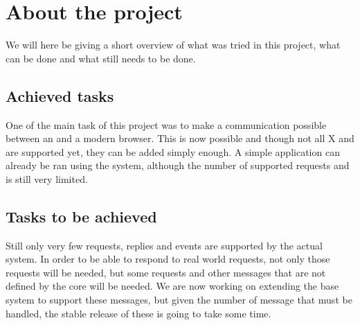 \section{About the project}
We will here be giving a short overview of what was tried in this project, 
what can be done and what still needs to be done.
\subsection{Achieved tasks}
One of the main task of this project was to make a communication possible 
between an  and a modern browser. This is now possible and though 
not all X  and  are supported yet, they can be added 
simply enough.
A simple application can already be ran using the system, although the 
number of supported requests and  is still very limited.
\subsection{Tasks to be achieved}
Still only very few requests, replies and events are supported by the 
actual system. In order to be able to respond to real world requests, 
not only those requests will be needed, but some requests and 
other messages that are not defined by the core 
 will be needed. 
We are now working on extending the base system to support 
these messages, but given the number of message that must be handled, 
the stable release of these is going to take some time.